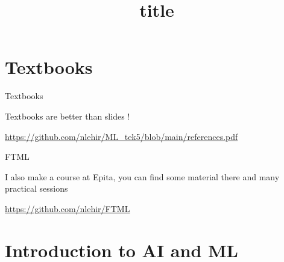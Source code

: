\documentclass[usenames,dvipsnames]{beamer}
\title[FTML]{title}
\date{} %
\begin{document}
\begin{frame}
\titlepage %
\end{frame}

\section{Textbooks}

\begin{frame}{Textbooks}

Textbooks are better than slides !

\url{https://github.com/nlehir/ML_tek5/blob/main/references.pdf} 

\end{frame}

\begin{frame}{FTML}

    I also make a course at Epita, you can find some material there and many practical sessions

    \url{https://github.com/nlehir/FTML} 

\end{frame}

\section{Introduction to AI and ML}
\end{document}
